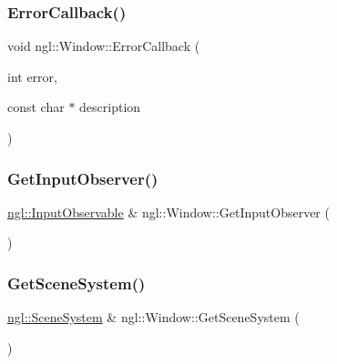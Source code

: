 \mbox{\label{classngl_1_1_window_ac1e0712951df9d90c1a11af5cb8bfbb9}} 
\subsubsection{\texorpdfstring{Error\+Callback()}{ErrorCallback()}}
{\footnotesize\ttfamily void ngl\+::\+Window\+::\+Error\+Callback (\begin{DoxyParamCaption}\item[{int}]{error,  }\item[{const char $\ast$}]{description }\end{DoxyParamCaption})\hspace{0.3cm}{\ttfamily [static]}}

\mbox{\label{classngl_1_1_window_a82e6eafdce102fde3a240a31bcc79d70}} 
\subsubsection{\texorpdfstring{Get\+Input\+Observer()}{GetInputObserver()}}
{\footnotesize\ttfamily \mbox{\hyperlink{classngl_1_1_input_observable}{ngl\+::\+Input\+Observable}} \& ngl\+::\+Window\+::\+Get\+Input\+Observer (\begin{DoxyParamCaption}{ }\end{DoxyParamCaption})}

\mbox{\label{classngl_1_1_window_a2ab238e35cd9cdc3863ccf16cae5992a}} 
\subsubsection{\texorpdfstring{Get\+Scene\+System()}{GetSceneSystem()}}
{\footnotesize\ttfamily \mbox{\hyperlink{classngl_1_1_scene_system}{ngl\+::\+Scene\+System}} \& ngl\+::\+Window\+::\+Get\+Scene\+System (\begin{DoxyParamCaption}{ }\end{DoxyParamCaption})}

